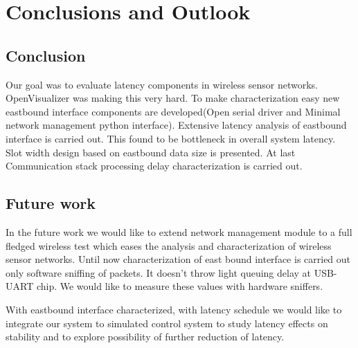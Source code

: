 \chapter{Conclusions and Outlook}


\section{Conclusion}
Our goal was to evaluate latency components in wireless sensor networks. OpenVisualizer was making this very hard. To make characterization easy new eastbound interface components are developed(Open serial driver and Minimal network management python interface). Extensive latency analysis of eastbound interface is carried out. This found to be bottleneck in overall system latency. Slot width design based on eastbound data size is presented. At last Communication stack processing delay characterization is carried out.


\section{Future work}
In the future work we would like to extend network management module to a full fledged wireless test which eases the analysis and characterization of wireless sensor networks. Until now characterization of east bound interface is carried out only software sniffing of packets. It doesn't throw light queuing delay at USB-UART chip. We would like to measure these values with hardware sniffers.

With eastbound interface characterized, with latency schedule we would like to integrate our system to simulated control system to study latency effects on stability and to explore possibility of further reduction of latency.